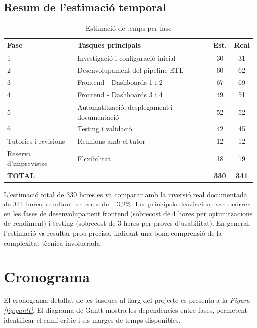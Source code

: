 \subsection{Resum de l'estimació temporal}
\begin{table}[h]
\centering
\small
\caption{Estimació de temps per fase}
\begin{tabular}{|l|l|c|c|}
\hline
\textbf{Fase} & \textbf{Tasques principals} & \textbf{Est.} & \textbf{Real} \\
\hline
1 & Investigació i configuració inicial & 30 & 31 \\
\hline
2 & Desenvolupament del pipeline ETL & 60 & 62 \\
\hline
3 & Frontend - Dashboards 1 i 2 & 67 & 69 \\
\hline
4 & Frontend - Dashboards 3 i 4 & 49 & 51 \\
\hline
5 & Automatització, desplegament i documentació & 52 & 52 \\
\hline
6 & Testing i validació & 42 & 45 \\
\hline
Tutories i revisions & Reunions amb el tutor & 12 & 12 \\
\hline
Reserva d'imprevistos & Flexibilitat & 18 & 19 \\
\hline
\textbf{TOTAL} & & \textbf{330} & \textbf{341} \\
\hline
\end{tabular}
\label{tab:time-estimation-planning}
\end{table}

L'estimació total de 330 hores es va comparar amb la inversió real documentada de 341 hores, resultant un error de +3,2\%. Les principals desviacions van ocórrer en les fases de desenvolupament frontend (sobrecost de 4 hores per optimitzacions de rendiment) i testing (sobrecost de 3 hores per proves d'usabilitat). En general, l'estimació va resultar prou precisa, indicant una bona comprensió de la complexitat tècnica involucrada.

\section{Cronograma}

El cronograma detallat de les tasques al llarg del projecte es presenta a la \textit{Figura \ref{fig:gantt}}. El diagrama de Gantt mostra les dependències entre fases, permetent identificar el camí crític i els marges de temps disponibles.

